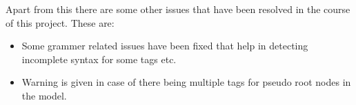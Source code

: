 Apart from this there are some other issues that have been resolved in the course of this project. These are:
\begin{itemize}
	\item Some grammer related issues have been fixed that help in detecting incomplete syntax for some tags etc.
	\item Warning is given in case of there being multiple tags for pseudo root nodes in the model.
\end{itemize}
